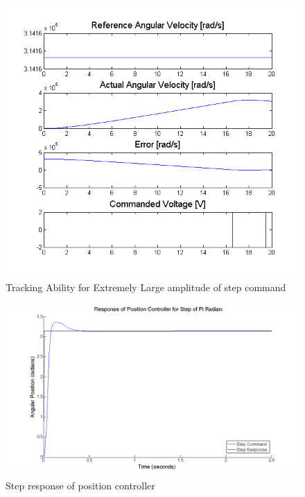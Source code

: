 \documentclass{article}
\theoremstyle{plain}
\theoremstyle{definition}
\theoremstyle{remark}
\begin{document}
\begin{figure}[htb]
\begin{center}
\includegraphics[width = 16cm]{q5b.png}
\caption{Tracking Ability for Extremely Large amplitude of step command}
\label{q5_b0}
\end{center}
\end{figure}



\begin{figure}[htb]
\begin{center}
\includegraphics[width = 14cm]{posstep_1pi.png}
\caption{Step response of position controller}
\label{q5_b1}
\end{center}
\end{figure}
\end{document}
